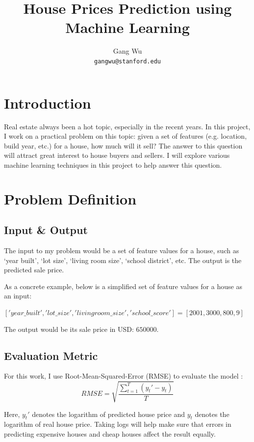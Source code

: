 \documentclass{article} %
\title{House Prices Prediction using Machine Learning}
\author{
Gang Wu\\
\texttt{gangwu@stanford.edu} \\
}
\begin{document}
\maketitle

\section{Introduction}

Real estate always been a hot topic, especially in the recent years.
In this project, I work on a practical problem on this topic:
given a set of features (e.g. location, build year, etc.) for a house,
how much will it sell?
The answer to this question will attract great interest to house buyers and sellers.
I will explore various machine learning techniques in this project to help answer this question.

\section{Problem Definition}

\subsection{Input \& Output}

The input to my problem would be a set of feature values for a house,
such as `year built', `lot size', `living room size', `school district', etc.
The output is the predicted sale price.

As a concrete example, below is a simplified set of feature values for a house as an input:

$['year\_built', 'lot\_size', 'livingroom\_size', 'school\_score'] = [2001, 3000, 800, 9]$

The output would be its sale price in USD: $650000$.

\subsection{Evaluation Metric}

For this work, I use Root-Mean-Squared-Error (RMSE) to evaluate the model \cite{rmse}:
\begin{equation*}
	RMSE = \sqrt{\frac{\sum_{t=1}^{T}(y_t' - y_t)}{T}}
\end{equation*}

Here, $y_t'$ denotes the logarithm of predicted house price 
and $y_t$ denotes the logarithm of real house price.
Taking logs will help make sure that errors in predicting expensive houses 
and cheap houses affect the result equally.
\end{document}
